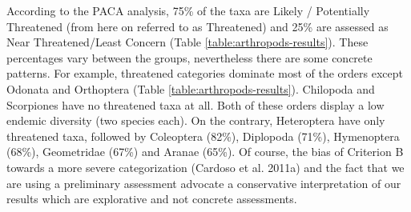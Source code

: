 According to the PACA analysis, 75\% of the taxa are Likely / Potentially
Threatened (from here on referred to as Threatened) and 25\% are assessed as
Near Threatened/Least Concern (Table \ref{table:arthropods-results}). These percentages vary between the groups,
nevertheless there are some concrete patterns. For example, threatened
categories dominate most of the orders except Odonata and Orthoptera (Table \ref{table:arthropods-results}).
Chilopoda and Scorpiones have no threatened taxa at all. Both of these orders
display a low endemic diversity (two species each). On the contrary,
Heteroptera have only threatened taxa, followed by Coleoptera (82\%),
Diplopoda (71\%), Hymenoptera (68\%), Geometridae (67\%) and Aranae (65\%).
Of course, the bias of Criterion B towards a more severe categorization
(Cardoso et al. 2011a) and the fact that we are using a preliminary assessment
advocate a conservative interpretation of our results which are explorative and not concrete assessments.


